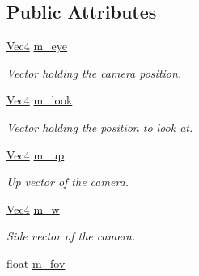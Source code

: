 \subsection*{Public Attributes}
\begin{DoxyCompactItemize}
\item 
\hypertarget{classCamera_a0e749de4c7cc7a498f660dacd1f09803}{
\hyperlink{classVec4}{Vec4} \hyperlink{classCamera_a0e749de4c7cc7a498f660dacd1f09803}{m\_\-eye}}
\label{classCamera_a0e749de4c7cc7a498f660dacd1f09803}

\begin{DoxyCompactList}\small\item\em Vector holding the camera position. \item\end{DoxyCompactList}\item 
\hypertarget{classCamera_a30cab8964b853fe98bc7c782758ad472}{
\hyperlink{classVec4}{Vec4} \hyperlink{classCamera_a30cab8964b853fe98bc7c782758ad472}{m\_\-look}}
\label{classCamera_a30cab8964b853fe98bc7c782758ad472}

\begin{DoxyCompactList}\small\item\em Vector holding the position to look at. \item\end{DoxyCompactList}\item 
\hypertarget{classCamera_a52836f0c95b8be35c397a5d4ea69ecee}{
\hyperlink{classVec4}{Vec4} \hyperlink{classCamera_a52836f0c95b8be35c397a5d4ea69ecee}{m\_\-up}}
\label{classCamera_a52836f0c95b8be35c397a5d4ea69ecee}

\begin{DoxyCompactList}\small\item\em Up vector of the camera. \item\end{DoxyCompactList}\item 
\hypertarget{classCamera_a6403bc3454964c1299955187cca102f5}{
\hyperlink{classVec4}{Vec4} \hyperlink{classCamera_a6403bc3454964c1299955187cca102f5}{m\_\-w}}
\label{classCamera_a6403bc3454964c1299955187cca102f5}

\begin{DoxyCompactList}\small\item\em Side vector of the camera. \item\end{DoxyCompactList}\item 
\hypertarget{classCamera_aa404a4e057fa16fb82ce8668d7a661b6}{
float \hyperlink{classCamera_aa404a4e057fa16fb82ce8668d7a661b6}{m\_\-fov}}
\label{classCamera_aa404a4e057fa16fb82ce8668d7a661b6}


\end{DoxyCompactItemize}
